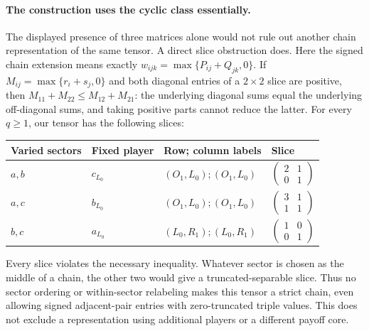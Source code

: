 \documentclass[11pt]{article}
\theoremstyle{remark}\newtheorem{remark}[theorem]{Remark}
\begin{document}
\paragraph{The construction uses the cyclic class essentially.}
The displayed presence of three matrices alone would not rule out another
chain representation of the same tensor. A direct slice obstruction does.
Here the signed chain extension means exactly
$w_{ijk}=\max\{P_{ij}+Q_{jk},0\}$.
If $M_{ij}=\max\{r_i+s_j,0\}$ and both diagonal entries of a $2\times2$
slice are positive, then
$M_{11}+M_{22}\leq M_{12}+M_{21}$: the underlying diagonal sums equal
the underlying off-diagonal sums, and taking positive parts cannot reduce
the latter. For every $q\geq1$, our tensor has the following slices:
\begin{center}
\begin{tabular}{llll}\toprule
Varied sectors & Fixed player & Row; column labels & Slice\\\midrule
$a,b$ & $c_{L_0}$ & $(O_1,L_0);(O_1,L_0)$ & $\left(\begin{smallmatrix}2&1\\0&1\end{smallmatrix}\right)$\\[3pt]
$a,c$ & $b_{L_0}$ & $(O_1,L_0);(O_1,L_0)$ & $\left(\begin{smallmatrix}3&1\\1&1\end{smallmatrix}\right)$\\[3pt]
$b,c$ & $a_{L_0}$ & $(L_0,R_1);(L_0,R_1)$ & $\left(\begin{smallmatrix}1&0\\0&1\end{smallmatrix}\right)$\\\bottomrule
\end{tabular}
\end{center}
Every slice violates the necessary inequality. Whatever sector is chosen
as the middle of a chain, the other two would give a truncated-separable
slice. Thus no sector ordering or within-sector relabeling makes this
tensor a strict chain, even allowing signed adjacent-pair entries with
zero-truncated triple values. This does not exclude a representation
using additional players or a different payoff core.
\end{document}
